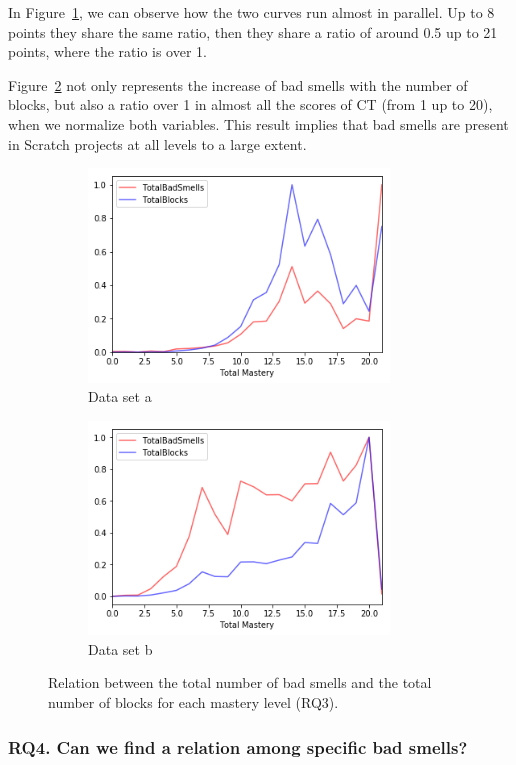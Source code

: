 In Figure~\ref{subfig:rq3_results_a}, we can observe how the two curves run almost in parallel. Up to 8 points they share the same ratio, then they share a ratio of around 0.5 up to 21 points, where the ratio is over 1.

Figure~\ref{subfig:rq3_results_b} not only represents the increase of bad smells with the number of blocks, but also a ratio over 1 in almost all the scores of CT (from 1 up to 20), when we normalize both variables. This result implies that bad smells are present in Scratch projects at all levels to a large extent. 

\begin{figure}
    \begin{subfigure}{.5\textwidth}
    \centering
    \includegraphics[width=8cm]{img/rq3_dataset_a.png}
    \caption{Data set a}
    \label{subfig:rq3_results_a}
  \end{subfigure}
  \begin{subfigure}{.5\textwidth}
    \centering
    \includegraphics[width=8cm]{img/rq3_dataset_b.png}
    \caption{Data set b}
    \label{subfig:rq3_results_b}
  \end{subfigure}
    \caption{Relation between the total number of bad smells and the total number of blocks for each mastery level (RQ3).}
    \label{fig:rq3_result}
\end{figure}


\subsubsection{RQ4. Can we find a relation among specific bad smells?}
\label{subsubsec:rq4_results}

